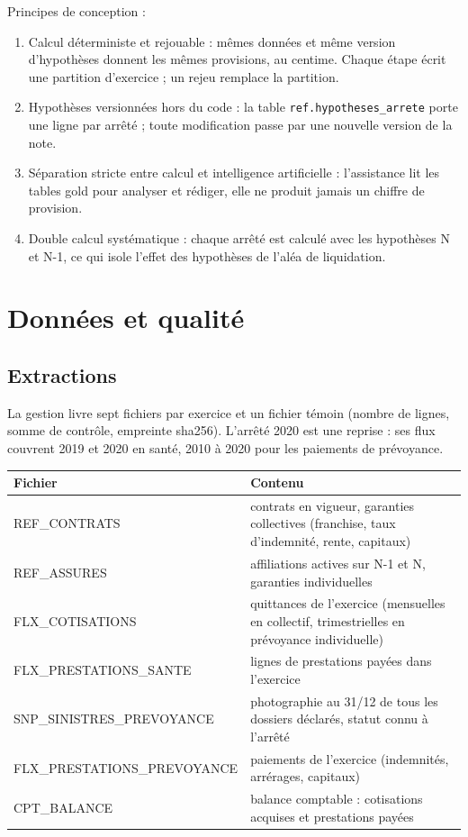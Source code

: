 \documentclass[11pt,a4paper]{article}
\begin{document}
Principes de conception :
\begin{enumerate}
\item Calcul déterministe et rejouable : mêmes données et même version d'hypothèses donnent les mêmes provisions, au centime. Chaque étape écrit une partition d'exercice ; un rejeu remplace la partition.
\item Hypothèses versionnées hors du code : la table \texttt{ref.hypotheses\_arrete} porte une ligne par arrêté ; toute modification passe par une nouvelle version de la note.
\item Séparation stricte entre calcul et intelligence artificielle : l'assistance lit les tables gold pour analyser et rédiger, elle ne produit jamais un chiffre de provision.
\item Double calcul systématique : chaque arrêté est calculé avec les hypothèses N et N-1, ce qui isole l'effet des hypothèses de l'aléa de liquidation.
\end{enumerate}

\section{Données et qualité}

\subsection{Extractions}
La gestion livre sept fichiers par exercice et un fichier témoin (nombre de lignes, somme de contrôle, empreinte sha256). L'arrêté 2020 est une reprise : ses flux couvrent 2019 et 2020 en santé, 2010 à 2020 pour les paiements de prévoyance.

\begin{center}\small
\begin{tabularx}{\textwidth}{@{}lX@{}}
\toprule
Fichier & Contenu \\
\midrule
REF\_CONTRATS & contrats en vigueur, garanties collectives (franchise, taux d'indemnité, rente, capitaux)\\
REF\_ASSURES & affiliations actives sur N-1 et N, garanties individuelles\\
FLX\_COTISATIONS & quittances de l'exercice (mensuelles en collectif, trimestrielles en prévoyance individuelle)\\
FLX\_PRESTATIONS\_SANTE & lignes de prestations payées dans l'exercice\\
SNP\_SINISTRES\_PREVOYANCE & photographie au 31/12 de tous les dossiers déclarés, statut connu à l'arrêté\\
FLX\_PRESTATIONS\_PREVOYANCE & paiements de l'exercice (indemnités, arrérages, capitaux)\\
CPT\_BALANCE & balance comptable : cotisations acquises et prestations payées\\
\bottomrule
\end{tabularx}
\end{center}
\end{document}
